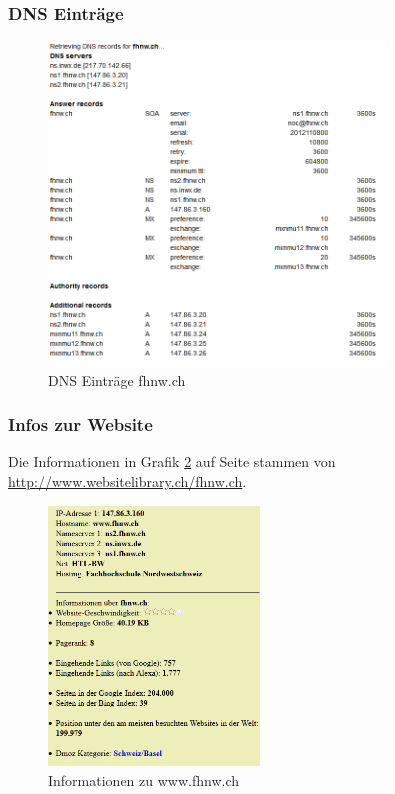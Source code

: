 \documentclass[11pt,a4paper]{scrartcl}
\begin{document}
\subsubsection{DNS Einträge}
\begin{figure}[h]
	\centering
	\includegraphics[width=0.8\textwidth]{../aufg5/dns_records.png}
	\caption{DNS Einträge fhnw.ch}
	\label{fig:dns_records}
\end{figure}

\subsubsection{Infos zur Website}
Die Informationen in Grafik \ref{fig:website_infos} auf Seite \pageref{fig:website_infos} stammen von \url{http://www.websitelibrary.ch/fhnw.ch}.
\begin{figure}[h]
	\centering
	\includegraphics[width=0.5\textwidth]{../aufg5/website_infos.png}
	\caption{Informationen zu www.fhnw.ch}
	\label{fig:website_infos}
\end{figure}
\end{document}
